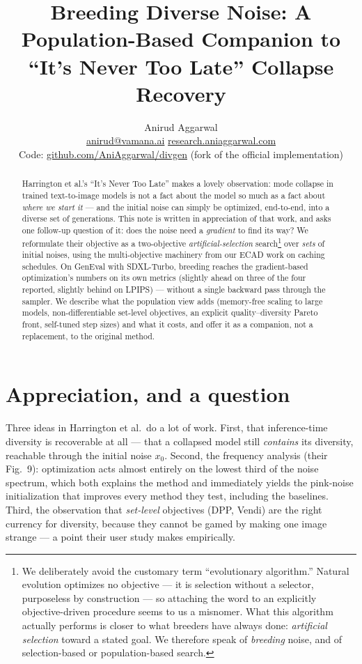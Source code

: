 \documentclass[10pt,twocolumn,letterpaper]{article}
\title{\LARGE \bf Breeding Diverse Noise: A Population-Based Companion to\\
``It's Never Too Late'' Collapse Recovery}
\author{Anirud Aggarwal\\
\small \href{mailto:anirud@vamana.ai}{anirud@vamana.ai} \;\;
\href{https://research.aniaggarwal.com}{research.aniaggarwal.com}\\
\small Code: \href{https://github.com/AniAggarwal/divgen}{github.com/AniAggarwal/divgen} (fork of the official implementation)}
\date{}
\begin{document}
\maketitle

\begin{abstract}
Harrington et al.'s ``It's Never Too Late'' makes a lovely observation: mode
collapse in trained text-to-image models is not a fact about the model so much
as a fact about \emph{where we start it} --- and the initial noise can simply be
optimized, end-to-end, into a diverse set of generations. This note is written
in appreciation of that work, and asks one follow-up question of it: does the
noise need a \emph{gradient} to find its way? We reformulate their objective as
a two-objective \emph{artificial-selection} search\footnote{We deliberately
avoid the customary term ``evolutionary algorithm.'' Natural evolution
optimizes no objective --- it is selection without a selector, purposeless by
construction --- so attaching the word to an explicitly objective-driven
procedure seems to us a misnomer. What this algorithm actually performs is
closer to what breeders have always done: \emph{artificial selection} toward a
stated goal. We therefore speak of \emph{breeding} noise, and of
selection-based or population-based search.} over \emph{sets} of initial
noises, using the multi-objective machinery from our ECAD work on caching
schedules. On GenEval with SDXL-Turbo, breeding reaches the gradient-based
optimization's numbers on its own metrics (slightly ahead on three of the
four reported, slightly behind on LPIPS) --- without a single backward pass
through the sampler. We describe what the population view adds
(memory-free scaling to large models, non-differentiable set-level objectives,
an explicit quality--diversity Pareto front, self-tuned step sizes) and what it
costs, and offer it as a companion, not a replacement, to the original method.
\end{abstract}

\section{Appreciation, and a question}

Three ideas in Harrington et al.\ do a lot of work. First, that
inference-time diversity is recoverable at all --- that a collapsed model still
\emph{contains} its diversity, reachable through the initial noise
$x_0$. Second, the frequency analysis (their Fig.~9): optimization acts almost
entirely on the lowest third of the noise spectrum, which both explains the
method and immediately yields the pink-noise initialization that improves
every method they test, including the baselines. Third, the observation that
\emph{set-level} objectives (DPP, Vendi) are the right currency for diversity,
because they cannot be gamed by making one image strange --- a point their user
study makes empirically.
\end{document}
